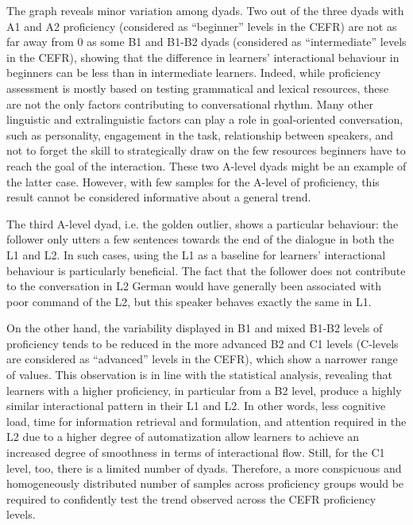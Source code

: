 The graph reveals minor variation among dyads. Two out of the three dyads with A1 and A2 proficiency (considered as “beginner” levels in the CEFR) are not as far away from 0 as some B1 and B1-B2 dyads (considered as “intermediate” levels in the CEFR), showing that the difference in learners’ interactional behaviour in beginners can be less than in intermediate learners. Indeed, while proficiency assessment is mostly based on testing grammatical and lexical resources, these are not the only factors contributing to conversational rhythm. Many other linguistic and extralinguistic factors can play a role in goal-oriented conversation, such as personality, engagement in the task, relationship between speakers, and not to forget the skill to strategically draw on the few resources beginners have to reach the goal of the interaction. These two A-level dyads might be an example of the latter case. However, with few samples for the A-level of proficiency, this result cannot be considered informative about a general trend.

The third A-level dyad, i.e. the golden outlier, shows a particular behaviour: the follower only utters a few sentences towards the end of the dialogue in both the L1 and L2. In such cases, using the L1 as a baseline for learners’ interactional behaviour is particularly beneficial. The fact that the follower does not contribute to the conversation in L2 German would have generally been associated with poor command of the L2, but this speaker behaves exactly the same in L1.

On the other hand, the variability displayed in B1 and mixed B1-B2 levels of proficiency tends to be reduced in the more advanced B2 and C1 levels (C-levels are considered as “advanced” levels in the CEFR), which show a narrower range of values. This observation is in line with the statistical analysis, revealing that learners with a higher proficiency, in particular from a B2 level, produce a highly similar interactional pattern in their L1 and L2. In other words, less cognitive load, time for information retrieval and formulation, and attention required in the L2 due to a higher degree of automatization allow learners to achieve an increased degree of smoothness in terms of interactional flow. Still, for the C1 level, too, there is a limited number of dyads. Therefore, a more conspicuous and homogeneously distributed number of samples across proficiency groups would be required to confidently test the trend observed across the CEFR proficiency levels.

